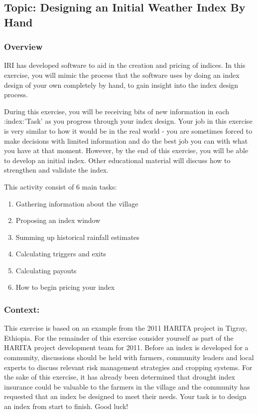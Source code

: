 \documentclass[letterpaper,10pt,english]{sphinxmanual}
\begin{document}
\subsection{Topic: Designing an Initial Weather Index By Hand}
\label{whatisindexinsurance/designingindexbyhand:topic-designing-an-initial-weather-index-by-hand}

\subsubsection{Overview}
\label{whatisindexinsurance/designingindexbyhand:overview}
IRI has developed software to aid in the creation and pricing of indices. In this exercise, you will mimic the process that the software uses by doing an index design of your own completely by hand, to gain insight into the index design process.

During this exercise, you will be receiving bits of new information in each :index:'Task' as you progress through your index design. Your job in this exercise is very similar to how it would be in the real world - you are sometimes forced to make decisions with limited information and do the best job you can with what you have at that moment. However, by the end of this exercise, you will be able to develop an initial index. Other educational material will discuss how to strengthen and validate the index.

This activity consist of 6 main tasks:
\begin{enumerate}
\item {} 
Gathering information about the village

\item {} 
Proposing an index window

\item {} 
Summing up historical rainfall estimates

\item {} 
Calculating triggers and exits

\item {} 
Calculating payouts

\item {} 
How to begin pricing your index

\end{enumerate}


\subsubsection{Context:}
\label{whatisindexinsurance/designingindexbyhand:context}
This exercise is based on an example from the 2011 HARITA project in Tigray, Ethiopia.
For the remainder of this exercise consider yourself as part of the HARITA project development team for 2011. Before an index is developed for a community, discussions should be held with farmers, community leaders and local experts to discuss relevant risk management strategies and cropping systems. For the sake of this exercise, it has already been determined that drought index insurance could be valuable to the farmers in the village and the community has requested that an index be designed to meet their needs. Your task is to design an index from start to finish. Good luck!
\end{document}
